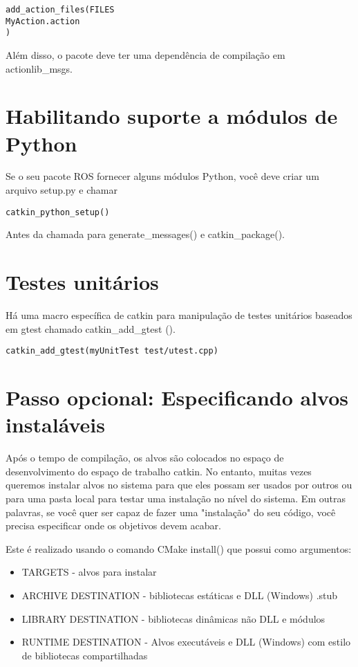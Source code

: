 \begin{verbatim}
add_action_files(FILES
MyAction.action
)
\end{verbatim}


Além disso, o pacote deve ter uma dependência de compilação em actionlib\_msgs.

\section{Habilitando suporte a módulos de Python}


Se o seu pacote ROS fornecer alguns módulos Python, você deve criar um arquivo setup.py e chamar

\begin{verbatim}
catkin_python_setup()
\end{verbatim}


Antes da chamada para generate\_messages() e catkin\_package().

\section{Testes unitários}

Há uma macro específica de catkin para manipulação de testes unitários baseados em gtest chamado catkin\_add\_gtest ().

\begin{verbatim}
catkin_add_gtest(myUnitTest test/utest.cpp)
\end{verbatim}

\section{Passo opcional: Especificando alvos instaláveis}


Após o tempo de compilação, os alvos são colocados no espaço de desenvolvimento do espaço de trabalho catkin. No entanto, muitas vezes queremos instalar alvos no sistema para que eles possam ser usados por outros ou para uma pasta local para testar uma instalação no nível do sistema. Em outras palavras, se você quer ser capaz de fazer uma "instalação" do seu código, você precisa especificar onde os objetivos devem acabar.

Este é realizado usando o comando CMake install() que possui como argumentos:

\begin{itemize}
	\setlength{\itemsep}{1pt}
	\setlength{\parskip}{0pt}
	\setlength{\parsep}{0pt}
	\item[] TARGETS - alvos para instalar
	\item[] ARCHIVE DESTINATION - bibliotecas estáticas e DLL (Windows) .stub
	\item[] LIBRARY DESTINATION - bibliotecas dinâmicas não DLL e módulos
	\item[] RUNTIME DESTINATION - Alvos executáveis e DLL (Windows) com estilo de bibliotecas compartilhadas
\end{itemize}

